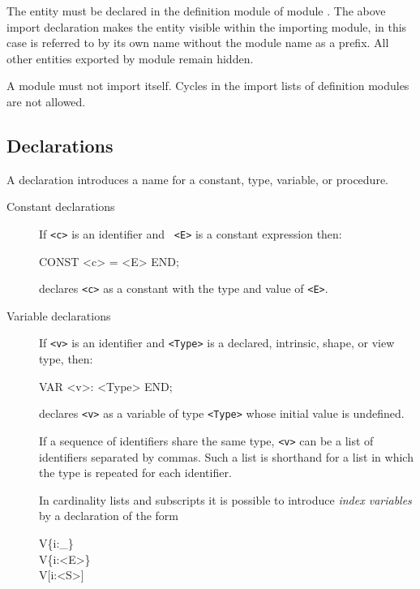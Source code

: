 \noindent The entity  must be declared in the definition module
of module . The above import declaration makes the entity
 visible within the importing module, in this case  is
referred to by its own name without the module name as a prefix. All
other entities exported by module  remain hidden.

A module must not import itself. Cycles in the import lists of
definition modules are not allowed.

\subsection*{Declarations}

A declaration introduces a name for a constant, type, variable, or
procedure. 


\begin{description}

\item[Constant declarations] If {\tt <c>} is an identifier and {\tt
<E>} is a constant expression then:

\begin{frag}
CONST <c> = <E> END;
\end{frag}

\noindent declares {\tt <c>} as a constant with the type and value of
{\tt <E>}.


\item[Variable declarations]

If {\tt <v>} is an identifier and {\tt <Type>} is a declared,
intrinsic, shape, or view type, then:

\begin{frag}
VAR <v>: <Type> END;
\end{frag}

\noindent declares {\tt <v>} as a variable of type {\tt <Type>} whose
initial value is undefined.

If a sequence of identifiers share the same type, {\tt <v>} can be a
list of identifiers separated by commas. Such a list is shorthand for
a list in which the type is repeated for each identifier.

In cardinality lists and subscripts it is possible to introduce {\em
index variables} by a declaration of the form

\begin{frag}
V\{i:\_\}\\
V\{i:<E>\}\\
V[i:<S>]\\
\end{frag}


\end{description}
